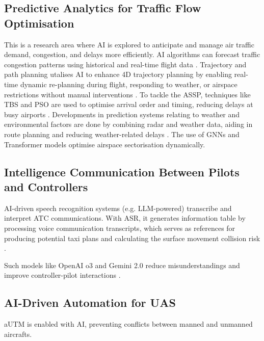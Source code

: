 \subsection{Predictive Analytics for Traffic Flow Optimisation}

This is a research area where \gls{AI} is explored to anticipate and manage air traffic demand, congestion, and delays more efficiently.
\gls{AI} algorithms can forecast traffic congestion patterns using historical and real-time flight data \cite{Ramachandran_2025}. 
Trajectory and path planning utalises \gls{AI} to enhance 4D trajectory planning by enabling real-time dynamic re-planning during flight, responding to weather, or airspace restrictions without manual interventions \cite{Meier_2024}. 
To tackle the \gls{ASSP}, techniques like \gls{TBS} and \gls{PSO} are used to optimise arrival order and timing, reducing delays at busy airports \cite{Meier_2024}. 
Developments in prediction systems relating to weather and environmental factors are done by combining radar and weather data, aiding in route planning and reducing weather-related delays \cite{Meier_2024} \cite{reynolds2023weather}. 
The use of \glspl{GNN} and Transformer models optimise airspace sectorisation dynamically. 



\subsection{Intelligence Communication Between Pilots and Controllers}

\gls{AI}-driven speech recognition systems (e.g. \gls{LLM}-powered) transcribe and interpret \gls{ATC} communications. 
With \gls{ASR}, it generates information table by processing voice communication transcripts, which serves as references for producing potential taxi plans and calculating the surface movement collision risk \cite{Pang_2025}.

Such models like OpenAI o3 and Gemini 2.0 reduce misunderstandings and improve controller-pilot interactions \cite{Ramachandran_2025}. 



\subsection{AI-Driven Automation for UAS}

\Gls{aUTM} is enabled with \gls{AI}, preventing conflicts between manned and unmanned aircrafts.

